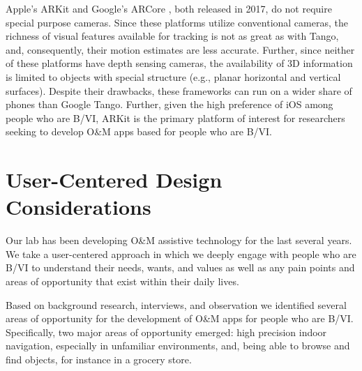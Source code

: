 \documentclass[chi_draft]{sigchi}
\newcommand{\BVI}{B/VI\xspace}
\newcommand{\OM}{O\&M\xspace}
\begin{document}

Apple's ARKit \cite{arkit} and Google's ARCore \cite{arcore}, both released in 2017, do not require special purpose cameras.  Since these platforms utilize conventional cameras, the richness of visual features available for tracking is not as great as with Tango, and, consequently, their motion estimates are less accurate.  Further, since neither of these platforms have depth sensing cameras, the availability of 3D information is limited to objects with special structure (e.g., planar horizontal and vertical surfaces).  Despite their drawbacks, these frameworks can run on a wider share of phones than Google Tango.  Further, given the high preference of iOS among people who are \BVI \cite{morris2014blind}, ARKit is the primary platform of interest for researchers seeking to develop \OM apps based for people who are \BVI.


\section{User-Centered Design Considerations}
Our lab has been developing \OM assistive technology for the last several years.  We take a user-centered approach in which we deeply engage with people who are \BVI to understand their needs, wants, and values as well as any pain points and areas of opportunity that exist within their daily lives.%

Based on background research, interviews, and observation we identified several areas of opportunity for the development of \OM apps for people who are \BVI.  Specifically, two major areas of opportunity emerged: high precision indoor navigation, especially in unfamiliar environments, and, being able to browse and find objects, for instance in a grocery store.
\end{document}
